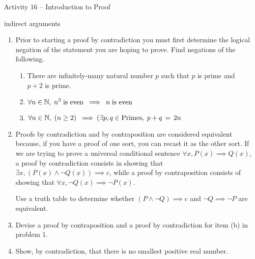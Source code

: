 \documentclass{amsart}
\begin{document}
\thispagestyle{empty}

\centerline{\Large Activity 16 -- Introduction to Proof}
\centerline{\large indirect arguments}

\bigskip
\Large


\begin{enumerate}

\item Prior to starting a proof by contradiction you must first determine the logical negation of the statement you are hoping to prove.  Find negations of the following.
\begin{enumerate}
\item \rule[-6pt]{0pt}{24pt} There are infinitely-many natural number $p$ such that $p$ is prime and $p+2$ is prime.
\item \rule[-6pt]{0pt}{24pt} $\displaystyle \forall n \in {\mathbb N}, \; n^3 \; \mbox{is even} \; \implies \; n \; \mbox{is even} $
\item \rule[-6pt]{0pt}{24pt} $\displaystyle \forall n \in {\mathbb N}, \; ( n \geq 2 ) \; \implies (\exists p,q \in \mbox{Primes}, \; p+q \, = \, 2n$
\end{enumerate}

\vfill

\item Proofs by contradiction and by contraposition are considered equivalent because, if you have a proof of one sort, you can recast it as the other sort.  If we are trying to prove a universal conditional sentence $\forall x, P(x) \implies Q(x)$,
a proof by contradiction consists in showing that $\exists x, (P(x) \land \lnot Q(x)) \implies c$, while a proof by contraposition consists of showing that  $\forall x, \lnot Q(x) \implies \lnot P(x)$.

Use a truth table to determine whether $(P \land \lnot Q) \implies c$ and $\lnot Q \implies \lnot P$ are equivalent.

\vfill

\vfill

\newpage

\item Devise a proof by contraposition and a proof by contradiction for item (b) in problem 1.

\vfill

\item Show, by contradiction, that there is no smallest positive real number.

\vfill

\newpage


\end{enumerate}
\end{document}
